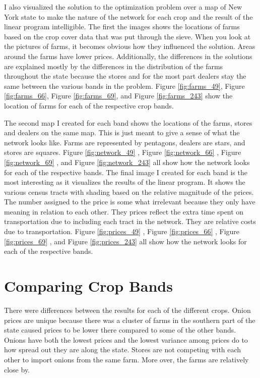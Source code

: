 \documentclass{report}
\begin{document}
I also visualized the solution to the optimization problem over a map of New York state to make the nature of the network for each crop and the result of the linear program intelligible. The first the images shows the locations of farms based on the crop cover data that was put through the sieve. When you look at the pictures of farms, it becomes obvious how they influenced the solution. Areas around the farms have lower prices. Additionally, the differences in the solutions are explained mostly by the differences in the distribution of the farms throughout the state because  the stores and for the most part dealers stay the same between the various bands in the problem. Figure \ref{fig:farms_49}, Figure \ref{fig:farms_66}, Figure \ref{fig:farms_69}, and Figure \ref{fig:farms_243} show the location of farms for each of the respective crop bands.

The second map I created for each band shows the locations of the farms, stores and dealers on the same map. This is just meant to give a sense of what the network looks like. Farms are represented by pentagons, dealers are stars, and stores are squares. Figure \ref{fig:network_49} , Figure \ref{fig:network_66} , Figure \ref{fig:network_69} , and Figure \ref{fig:network_243} all show how the network looks for each of the respective bands. The final image I created for each band is the most interesting as it  visualizes the results of the linear program. It shows the various census tracts with shading based on the relative magnitude of the prices. The  number assigned to the price is some what irrelevant because they only have meaning in relation to each other. They prices reflect the extra time spent on transportation due to including each tract in the network. They are  relative costs due to transportation. Figure \ref{fig:prices_49} , Figure \ref{fig:prices_66} , Figure \ref{fig:prices_69} , and Figure \ref{fig:prices_243} all show how the network looks for each of the respective bands.

\section{Comparing Crop Bands}

There were differences between the results for each of the different crops. Onion prices are unique because there was a cluster of farms in the southern part of the state caused prices to be lower there compared to some of the other bands. Onions have both the lowest prices and the lowest variance among prices do to how spread out they are along the state. Stores are not competing with each other to import onions from the same farm. More over, the farms are relatively close by.
\end{document}
